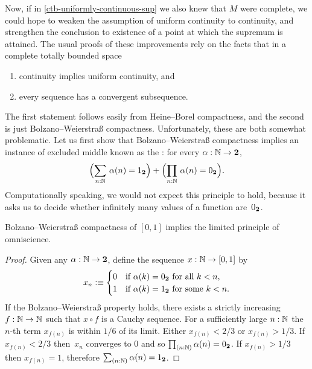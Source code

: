 Now, if in \cref{ctb-uniformly-continuous-sup} we also knew that $M$ were complete, we
could hope to weaken the assumption of uniform continuity to continuity, and strengthen
the conclusion to existence of a point at which the supremum is attained. The usual proofs
of these improvements rely on the facts that in a complete totally bounded space
%
\begin{enumerate}
\item continuity implies uniform continuity, and
\item every sequence has a convergent subsequence.
\end{enumerate}
%
The first statement follows easily from Heine--Borel compactness, and the second is just
Bolzano--Weierstra\ss{} compactness.
%
Unfortunately, these are both somewhat problematic. Let
us first show that Bolzano--Weierstra\ss{} compactness implies an instance of excluded middle
known as the :
%
%
for every $\alpha : \mathbb{N} \to \mathbf{2}$,
%
\begin{equation} \label{eq:lpo}
  \Parens{\sm{n : \N} \alpha(n) = \btrue} +
  \Parens{\prd{n : \N} \alpha(n) = \bfalse}.
\end{equation}
%
Computationally speaking, we would not expect this principle to hold, because it asks us to decide
whether infinitely many values of a function are~${0_{\mathbf{2}}}$.

\begin{thm} \label{analysis-bw-lpo}
  Bolzano--Weierstra\ss{} compactness of $[0,1]$ implies the limited principle of omniscience.
\end{thm}

\begin{proof}
  Given any $\alpha : \mathbb{N} \to \mathbf{2}$, define the sequence $x : \mathbb{N} \to [0,1]$ by
  \begin{equation*}
    x_n \vcentcolon\equiv
    \begin{cases}
      0 & \text{if $\alpha(k) = {0_{\mathbf{2}}}$ for all $k < n$,}\\
      1 & \text{if $\alpha(k) = {1_{\mathbf{2}}}$ for some $k < n$}.
    \end{cases}
  \end{equation*}
  If the Bolzano--Weierstra\ss{} property holds, there exists a strictly increasing $f : \mathbb{N} \to
  \mathbb{N}$ such that $x \circ f$ is a Cauchy sequence. For a sufficiently large $n :
  \mathbb{N}$ the $n$-th term $x_{f(n)}$ is within $1/6$ of its limit. Either $x_{f(n)} < 2/3$ or
  $x_{f(n)} > 1/3$. If $x_{f(n)} < 2/3$ then~$x_n$ converges to $0$ and so $\prd{n : \N}
  \alpha(n) = \bfalse$. If $x_{f(n)} > 1/3$ then $x_{f(n)} = 1$, therefore $\sm{n : \N}
  \alpha(n) = \btrue$.
\end{proof}

